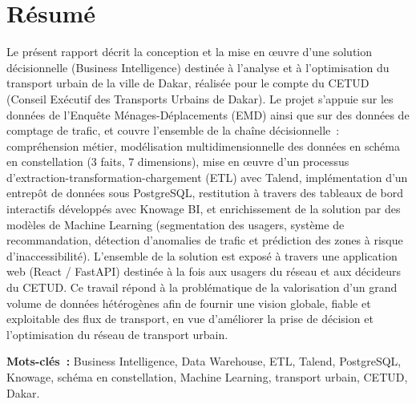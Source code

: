 \chapter*{Résumé}

Le présent rapport décrit la conception et la mise en œuvre d'une solution décisionnelle (Business Intelligence) destinée à l'analyse et à l'optimisation du transport urbain de la ville de Dakar, réalisée pour le compte du CETUD (Conseil Exécutif des Transports Urbains de Dakar). Le projet s'appuie sur les données de l'Enquête Ménages-Déplacements (EMD) ainsi que sur des données de comptage de trafic, et couvre l'ensemble de la chaîne décisionnelle~: compréhension métier, modélisation multidimensionnelle des données en schéma en constellation (3 faits, 7 dimensions), mise en œuvre d'un processus d'extraction-transformation-chargement (ETL) avec Talend, implémentation d'un entrepôt de données sous PostgreSQL, restitution à travers des tableaux de bord interactifs développés avec Knowage BI, et enrichissement de la solution par des modèles de Machine Learning (segmentation des usagers, système de recommandation, détection d'anomalies de trafic et prédiction des zones à risque d'inaccessibilité). L'ensemble de la solution est exposé à travers une application web (React / FastAPI) destinée à la fois aux usagers du réseau et aux décideurs du CETUD. Ce travail répond à la problématique de la valorisation d'un grand volume de données hétérogènes afin de fournir une vision globale, fiable et exploitable des flux de transport, en vue d'améliorer la prise de décision et l'optimisation du réseau de transport urbain.

\textbf{Mots-clés~:} Business Intelligence, Data Warehouse, ETL, Talend, PostgreSQL, Knowage, schéma en constellation, Machine Learning, transport urbain, CETUD, Dakar.

\clearpage
